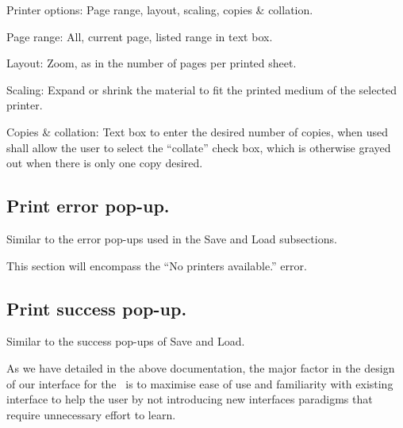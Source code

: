 Printer options: Page range, layout, scaling, copies \& collation.

Page range: All, current page, listed range in text box.

Layout: Zoom, as in the number of pages per printed sheet.

Scaling: Expand or shrink the material to fit the printed medium of the selected printer.

Copies \& collation: Text box to enter the desired number of copies, when used shall allow the user to select the ``collate'' check box, which is otherwise grayed out when there is only one copy desired.

\subsection{Print error pop-up.}

Similar to the error pop-ups used in the Save and Load subsections.

This section will encompass the ``No printers available.'' error.

\subsection{Print success pop-up.}

Similar to the success pop-ups of Save and Load.


As we have detailed in the above documentation, the major factor in the design of our interface for the \iDesk\ is to maximise ease of use and familiarity with existing interface to help the user by not introducing new interfaces paradigms that require unnecessary effort to learn.

\bye
